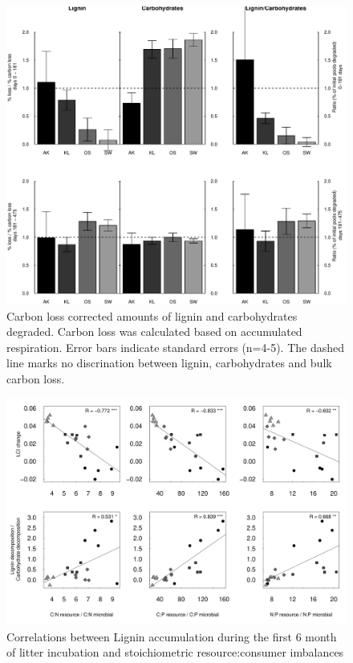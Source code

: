 \documentclass[10pt]{article}
\begin{document}
\newpage
\begin{figure}[h!]
\vspace*{2mm}
\begin{center}
\includegraphics{plosone-degrdiff}
\end{center}
\caption{Carbon loss corrected amounts of lignin and carbohydrates degraded. Carbon loss was calculated based on accumulated respiration. Error bars indicate standard errors (n=4-5). The dashed line marks no discrination between lignin, carbohydrates and bulk carbon loss.}
\label{fig:degr}
\end{figure}

\newpage
\begin{figure}[h!]
\vspace*{2mm}
\begin{center}
\includegraphics{plosone-graphcorr}
\end{center}
\caption{Correlations between Lignin accumulation during the first 6 month of litter incubation and stoichiometric resource:consumer imbalances}
\label{fig:cor1}
\end{figure}
\end{document}
